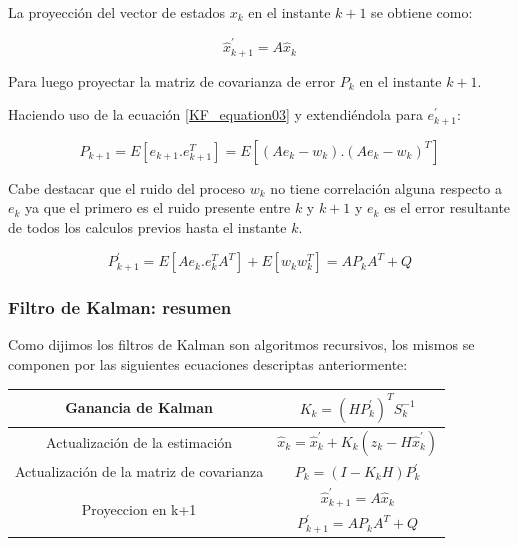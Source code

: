 \documentclass[10pt,a4paper]{article}
\begin{document}
	La proyección del vector de estados $x_k$ en el instante $k+1$ se obtiene como:
	
	\begin{equation}
		\hat{x}^\prime_{k+1} = A \hat{x}_k 
		\label{x_k_projection}
	\end{equation}	
	
	Para luego proyectar la matriz de covarianza de error $P_k$ en el instante $k+1$.
	
	Haciendo uso de la ecuación \ref{KF_equation03} y extendiéndola para $e^\prime_{k+1}$:
	
	\begin{equation}
		P_{k+1} = E[e_{k+1}.e_{k+1}^{T}] = E[(A e_k-w_k).(A  e_k-w_k)^{T}]
		\label{projection_p_k_aux}
	\end{equation}	
	
	Cabe destacar que el ruido del proceso $w_k$ no tiene correlación alguna respecto a $e_k$ ya que el primero es el ruido presente entre $k$ y $k+1$ y $e_k$ es el error resultante de todos los calculos previos hasta el instante $k$.
	
	\begin{equation}
		P^\prime_{k+1} = E[A e_{k}.e_{k}^{T}A^{T}]+ E[w_k w_k^{T}]= A P_k A^{T} + Q
		\label{projection_p_k}
	\end{equation}	
	
	\subsubsection{Filtro de Kalman: resumen}
	
	Como dijimos los filtros de Kalman son algoritmos recursivos, los mismos se componen por las siguientes ecuaciones descriptas anteriormente:
	
	\begin{table}[h!]
		\centering
		\begin{tabular}{|c|c|}
			\hline
			\rule{0pt}{4ex}	Ganancia de Kalman 							& $K_k = (H P^\prime_k)^T S_k^{-1}$  \\ \hline
			\rule{0pt}{4ex}	Actualización de la estimación			    &  $\hat{x}_k = \hat{x}^\prime_k + K_k (z_k - H\hat{x}^\prime_k)$\\ \hline
			\rule{0pt}{4ex}	Actualización de la matriz de covarianza    & $P_k = (I - K_k H) P^\prime_k$ \\ \hline
			\multirow{2}{*}{Proyeccion en k+1}        		  			& \rule{0pt}{4ex} $\hat{x}^\prime_{k+1} = A \hat{x}_k$ \\ \cline{2-2}
			& \rule{0pt}{4ex} $P^\prime_{k+1} = A P_k A^{T} + Q$ \\ \hline
		\end{tabular}
		\label{Ecuaciones_Kalman}
	\end{table}
	
\end{document}

